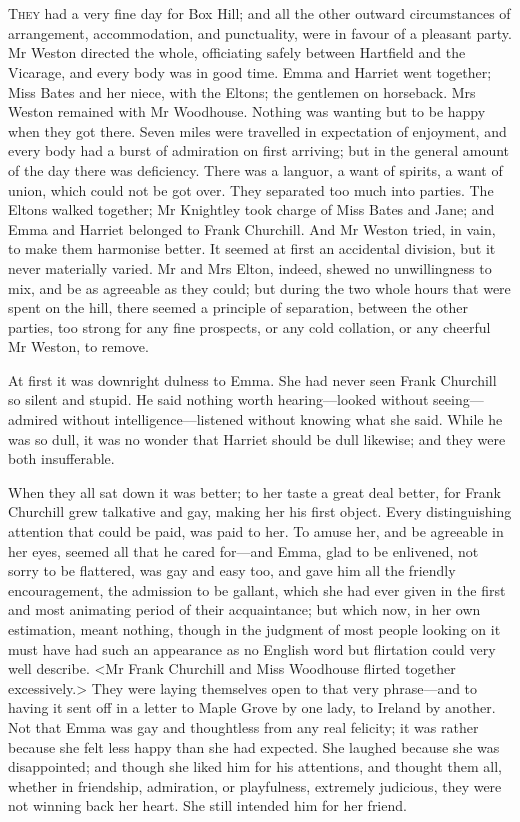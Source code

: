 \chapter[Chapter \thechapter]{}
\lettrine[lraise=0.3]{T}{hey} had a very fine day for Box Hill; and all the other outward circumstances of arrangement, accommodation, and punctuality, were in favour of a pleasant party. Mr Weston directed the whole, officiating safely between Hartfield and the Vicarage, and every body was in good time. Emma and Harriet went together; Miss Bates and her niece, with the Eltons; the gentlemen on horseback. Mrs Weston remained with Mr Woodhouse. Nothing was wanting but to be happy when they got there. Seven miles were travelled in expectation of enjoyment, and every body had a burst of admiration on first arriving; but in the general amount of the day there was deficiency. There was a languor, a want of spirits, a want of union, which could not be got over. They separated too much into parties. The Eltons walked together; Mr Knightley took charge of Miss Bates and Jane; and Emma and Harriet belonged to Frank Churchill. And Mr Weston tried, in vain, to make them harmonise better. It seemed at first an accidental division, but it never materially varied. Mr and Mrs Elton, indeed, shewed no unwillingness to mix, and be as agreeable as they could; but during the two whole hours that were spent on the hill, there seemed a principle of separation, between the other parties, too strong for any fine prospects, or any cold collation, or any cheerful Mr Weston, to remove.

At first it was downright dulness to Emma. She had never seen Frank Churchill so silent and stupid. He said nothing worth hearing—looked without seeing—admired without intelligence—listened without knowing what she said. While he was so dull, it was no wonder that Harriet should be dull likewise; and they were both insufferable.

When they all sat down it was better; to her taste a great deal better, for Frank Churchill grew talkative and gay, making her his first object. Every distinguishing attention that could be paid, was paid to her. To amuse her, and be agreeable in her eyes, seemed all that he cared for—and Emma, glad to be enlivened, not sorry to be flattered, was gay and easy too, and gave him all the friendly encouragement, the admission to be gallant, which she had ever given in the first and most animating period of their acquaintance; but which now, in her own estimation, meant nothing, though in the judgment of most people looking on it must have had such an appearance as no English word but flirtation could very well describe. <Mr Frank Churchill and Miss Woodhouse flirted together excessively.> They were laying themselves open to that very phrase—and to having it sent off in a letter to Maple Grove by one lady, to Ireland by another. Not that Emma was gay and thoughtless from any real felicity; it was rather because she felt less happy than she had expected. She laughed because she was disappointed; and though she liked him for his attentions, and thought them all, whether in friendship, admiration, or playfulness, extremely judicious, they were not winning back her heart. She still intended him for her friend.

